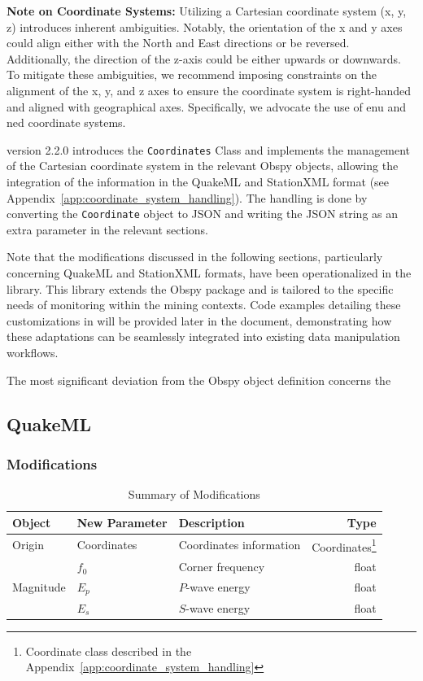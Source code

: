 \begin{mdframed}[backgroundcolor=gray!20]
\textbf{Note on Coordinate Systems:} Utilizing a Cartesian coordinate system (x, y, z) introduces inherent ambiguities. Notably, the orientation of the x and y axes could align either with the North and East directions or be reversed. Additionally, the direction of the z-axis could be either upwards or downwards. To mitigate these ambiguities, we recommend imposing constraints on the alignment of the x, y, and z axes to ensure the coordinate system is right-handed and aligned with geographical axes. Specifically, we advocate the use of \gls{enu} and \gls{ned} coordinate systems.

\muquake version 2.2.0 introduces the \texttt{Coordinates} Class and implements the management of the Cartesian coordinate system in the relevant Obspy objects, allowing the integration of the information in the QuakeML and StationXML format (see Appendix~\ref{app:coordinate_system_handling}). The handling is done by converting the \texttt{Coordinate} object to JSON and writing the JSON string as an extra parameter in the relevant sections.
\end{mdframed}

Note that the modifications discussed in the following sections, particularly concerning QuakeML and StationXML formats, have been operationalized in the \muquake library. This library extends the Obspy package and is tailored to the specific needs of \museismic monitoring within the mining contexts. Code examples detailing these customizations in \muquake will be provided later in the document, demonstrating how these adaptations can be seamlessly integrated into existing data manipulation workflows.


The most significant deviation from the Obspy object definition concerns the 


\subsection{QuakeML}
\subsubsection{Modifications}

\begin{table}[!h]
\centering
\caption{Summary of Modifications}
\begin{tabular}{lllr}
\hline
\textbf{Object} & \textbf{New Parameter} & \textbf{Description} & \textbf{Type} \\
\hline
\multirow{1}{*}{Origin}     & Coordinates & Coordinates information & Coordinates\footnote{Coordinate class described in the Appendix~\ref{app:coordinate_system_handling}} \\
\hline
\multirow{3}{*}{Magnitude}  & \(f_0\) & Corner frequency & float \\
                            & \(E_p\) & \(P\)-wave energy & float \\
                            & \(E_s\) & \(S\)-wave energy & float \\
\hline
\end{tabular}
\end{table}

